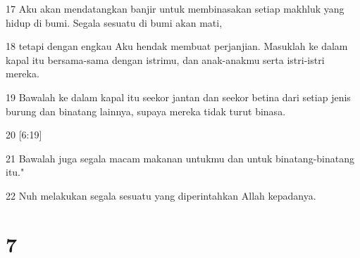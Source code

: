 \par 17 Aku akan mendatangkan banjir untuk membinasakan setiap makhluk yang hidup di bumi. Segala sesuatu di bumi akan mati,
\par 18 tetapi dengan engkau Aku hendak membuat perjanjian. Masuklah ke dalam kapal itu bersama-sama dengan istrimu, dan anak-anakmu serta istri-istri mereka.
\par 19 Bawalah ke dalam kapal itu seekor jantan dan seekor betina dari setiap jenis burung dan binatang lainnya, supaya mereka tidak turut binasa.
\par 20 [6:19]
\par 21 Bawalah juga segala macam makanan untukmu dan untuk binatang-binatang itu."
\par 22 Nuh melakukan segala sesuatu yang diperintahkan Allah kepadanya.

\chapter{7}

